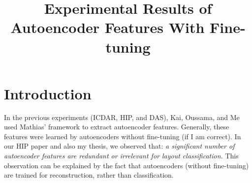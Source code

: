 \documentclass[conference]{IEEEtran}
\begin{document}
%

\title{Experimental Results of Autoencoder Features With Fine-tuning}


\begin{comment}

\author{\IEEEauthorblockN{Michael Shell}
\IEEEauthorblockA{School of Electrical and\\Computer Engineering\\
Georgia Institute of Technology\\
Atlanta, Georgia 30332--0250\\
Email: http://www.michaelshell.org/contact.html}
\and
\IEEEauthorblockN{Homer Simpson}
\IEEEauthorblockA{Twentieth Century Fox\\
Springfield, USA\\
Email: homer@thesimpsons.com}
\and
\IEEEauthorblockN{James Kirk\\ and Montgomery Scott}
\IEEEauthorblockA{Starfleet Academy\\
San Francisco, California 96678--2391\\
Telephone: (800) 555--1212\\
Fax: (888) 555--1212}}

\end{comment}


\maketitle

\begin{abstract}

\end{abstract}




\IEEEpeerreviewmaketitle



\section{Introduction}



In the previous experiments (ICDAR, HIP, and DAS), Kai, Oussama, and Me used Mathias' framework to extract autoencoder features.
Generally, these features were learned by autoencoders without fine-tuning (if I am correct).
In our HIP paper and also my thesis, we observed that: \textit{a significant number of autoencoder features are redundant or irrelevant for layout classification.}
This observation can be explained by the fact that autoencoders (without fine-tuning) are trained for reconstruction, rather than classification.
\end{document}
